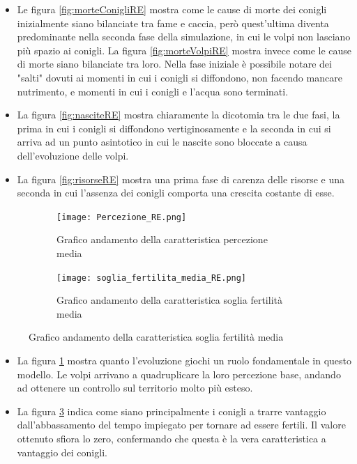 \documentclass[11pt]{article}
\begin{document}
\vspace{1cm}
\begin{itemize}


    \item Le figura \ref{fig:morteConigliRE} mostra come le cause di morte dei conigli inizialmente siano bilanciate tra fame e caccia, però quest'ultima diventa predominante nella seconda fase della simulazione, in cui le volpi non lasciano più spazio ai conigli. La figura \ref{fig:morteVolpiRE} mostra invece come le cause di morte siano bilanciate tra loro. Nella fase iniziale è possibile notare dei "salti" dovuti ai momenti in cui i conigli si diffondono, non facendo mancare nutrimento, e momenti in cui i conigli e l'acqua sono terminati.


    \item La figura \ref{fig:nasciteRE} mostra chiaramente la dicotomia tra le due fasi, la prima in cui i conigli si diffondono vertiginosamente e la seconda in cui si arriva ad un punto asintotico in cui le nascite sono bloccate a causa dell'evoluzione delle volpi.


    \item La figura \ref{fig:risorseRE} mostra una prima fase di carenza delle risorse e una seconda in cui l'assenza dei conigli comporta una crescita costante di esse.

\end{itemize}

\begin{figure}[h!]
	\hspace{-5mm}
	\begin{subfigure}{.52\textwidth}
         \centering
         \texttt{[image: Percezione\_RE.png]}
         \caption{Grafico andamento della caratteristica percezione media}
         \label{fig:percezioneRE}
	\end{subfigure}
	\begin{subfigure}{.55\textwidth}
		\hspace{12mm}
		\centering
        \texttt{[image: soglia\_fertilita\_media\_RE.png]}
        \caption{Grafico andamento della caratteristica soglia fertilità media}
        \label{fig:fertilitaRE}
	\end{subfigure}
\end{figure}

\begin{itemize}


    \item La figura \ref{fig:percezioneRE} mostra quanto l'evoluzione giochi un ruolo fondamentale in questo modello. Le volpi arrivano a quadruplicare la loro percezione base, andando ad ottenere un controllo sul territorio molto più esteso.

    \item La figura \ref{fig:fertilitaRE} indica come siano principalmente i conigli a trarre vantaggio dall'abbassamento del tempo impiegato per tornare ad essere fertili. Il valore ottenuto sfiora lo zero, confermando che questa è la vera caratteristica a vantaggio dei conigli. 
\end{itemize}
\end{document}
